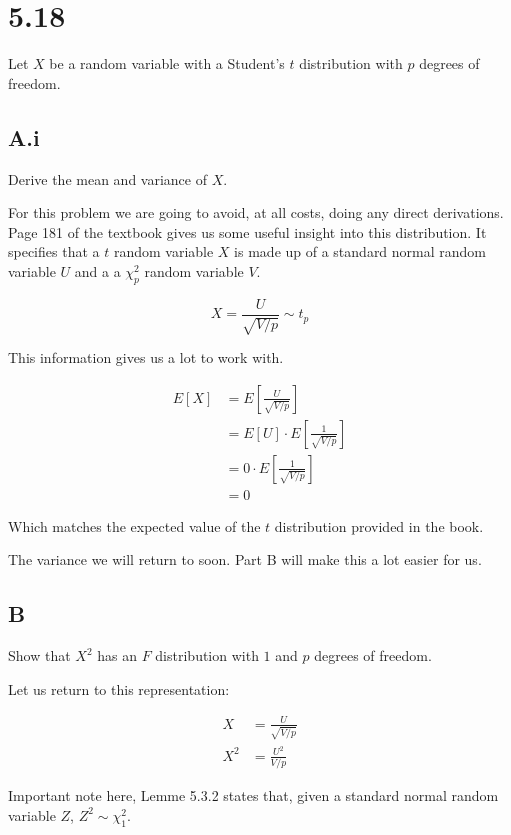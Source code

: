 \section*{5.18}

Let $X$ be a random variable with a Student's $t$ distribution with $p$ degrees of freedom.

\subsection*{A.i}

Derive the mean and variance of $X$.

For this problem we are going to avoid, at all costs, doing any direct derivations. Page 181 of the textbook gives us some useful insight into this distribution. It specifies that a $t$ random variable $X$ is made up of a standard normal random variable $U$ and a a $\chi^2_p$ random variable $V$. 

\[X = \frac{U}{\sqrt{V/p}} \sim t_p\]

This information gives us a lot to work with. 

\begin{align*}
	E[X] &= E\left[ \frac{U}{\sqrt{V/p}}  \right] \\
	&= E[U] \cdot E\left[ \frac{1}{\sqrt{V/p}} \right] \\
	&= 0 \cdot E\left[ \frac{1}{\sqrt{V/p}} \right] \\
	&= 0
\end{align*}

Which matches the expected value of the $t$ distribution provided in the book.

The variance we will return to soon. Part B will make this a lot easier for us. 

\subsection*{B}

Show that $X^2$ has an $F$ distribution with $1$ and $p$ degrees of freedom.

Let us return to this representation:

\vspace{-4mm}
\begin{align*}
	X &= \frac{U}{\sqrt{V/p}} \\
	X^2 &= \frac{U^2}{V/p}
\end{align*}

Important note here, Lemme 5.3.2 states that, given a standard normal random variable $Z$, $Z^2 \sim \chi^2_1$.

